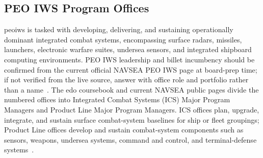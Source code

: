 \documentclass[../main.tex]{subfiles}
\begin{document}

\subsection{PEO IWS Program Offices}
\label{subsec:peoiws-programs}

\ac{peoiws} is tasked with developing, delivering, and sustaining operationally dominant integrated combat systems, encompassing surface radars, missiles, launchers, electronic warfare suites, undersea sensors, and integrated shipboard computing environments. PEO IWS leadership and billet incumbency should be confirmed from the current official NAVSEA PEO IWS page at board-prep time; if not verified from the live source, answer with office role and portfolio rather than a name~\autocite{navsea-peo-iws-homepage-2026}. The \ac{edo} coursebook and current NAVSEA public pages divide the numbered offices into Integrated Combat Systems (ICS) Major Program Managers and Product Line Major Program Managers. ICS offices plan, upgrade, integrate, and sustain surface combat-system baselines for ship or fleet groupings; Product Line offices develop and sustain combat-system components such as sensors, weapons, undersea systems, command and control, and terminal-defense systems~\autocite{edo-2-1-2-navsea-organization-2025,navsea-peo-iws-about-2026,navsea-peo-iws-industry-engagement-2026}.
\end{document}

